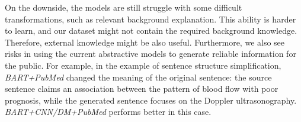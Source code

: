 \documentclass[letterpaper, table]{article} %
\begin{document}


On the downside, the  models are still struggle with some difficult transformations, such as relevant background explanation. This ability is harder to learn, and our dataset might not contain the required background knowledge. 
Therefore, external knowledge might be also useful. 
Furthermore, we also see risks in using the current abstractive models to generate reliable information for the public. For example, in the example of sentence structure simplification, \textit{BART+PubMed} changed the meaning of the original sentence: the source sentence claims an association between the pattern of blood flow with poor prognosis, while the generated sentence focuses on the Doppler ultrasonography. \textit{BART+CNN/DM+PubMed}
performs better in this case.
\end{document}
